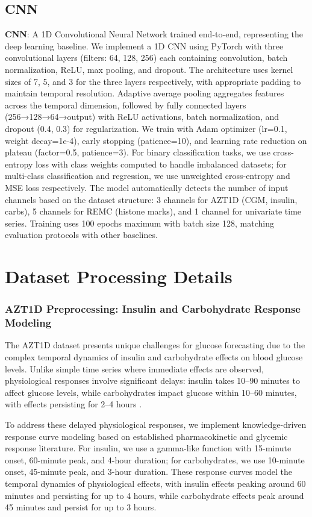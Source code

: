 \subsection{CNN}
\textbf{CNN}: A 1D Convolutional Neural Network trained end-to-end, representing
the deep learning baseline. We implement a 1D CNN using PyTorch with three
convolutional layers (filters: 64, 128, 256) each containing convolution, batch
normalization, ReLU, max pooling, and dropout. The architecture uses kernel sizes
of 7, 5, and 3 for the three layers respectively, with appropriate padding to
maintain temporal resolution. Adaptive average pooling aggregates features across
the temporal dimension, followed by fully connected layers (256→128→64→output)
with ReLU activations, batch normalization, and dropout (0.4, 0.3) for
regularization. We train with Adam optimizer (lr=0.1, weight decay=1e-4), early
stopping (patience=10), and learning rate reduction on plateau (factor=0.5,
patience=3). For binary classification tasks, we use cross-entropy loss with
class weights computed to handle imbalanced datasets; for multi-class
classification and regression, we use unweighted cross-entropy and MSE loss
respectively. The model automatically detects the number of input channels based
on the dataset structure: 3 channels for AZT1D (CGM, insulin, carbs), 5 channels
for REMC (histone marks), and 1 channel for univariate time series. Training
uses 100 epochs maximum with batch size 128, matching evaluation protocols with
other baselines.

\section{Dataset Processing Details}

\subsubsection{AZT1D Preprocessing: Insulin and Carbohydrate Response Modeling}

The AZT1D dataset presents unique challenges for glucose forecasting due to the
complex temporal dynamics of insulin and carbohydrate effects on blood glucose
levels.
Unlike simple time series where immediate effects are observed, physiological
responses involve significant delays: insulin takes 10--90 minutes to affect
glucose levels, while carbohydrates impact glucose within 10--60 minutes, with
effects persisting for 2--4 hours \cite{woldaregay2019data}.

To address these delayed physiological responses, we implement knowledge-driven
response curve modeling based on established pharmacokinetic and glycemic
response literature.
For insulin, we use a gamma-like function with 15-minute onset, 60-minute peak,
and 4-hour duration; for carbohydrates, we use 10-minute onset, 45-minute peak,
and 3-hour duration.
These response curves model the temporal dynamics of physiological effects, with
insulin effects peaking around 60 minutes and persisting for up to 4 hours,
while carbohydrate effects peak around 45 minutes and persist for up to 3 hours.

